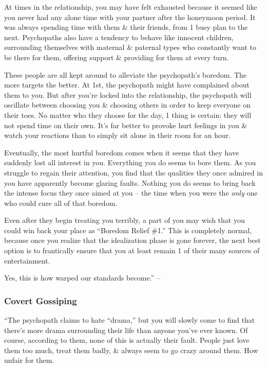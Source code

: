 \documentclass{article}
\numberwithin{equation}{section}
\begin{document}
At times in the relationship, you may have felt exhausted because it seemed like you never had any alone time with your partner after the honeymoon period. It was always spending time with them \& their friends, from 1 busy plan to the next. Psychopaths also have a tendency to behave like innocent children, surrounding themselves with maternal \& paternal types who constantly want to be there for them, offering support \& providing for them at every turn.

These people are all kept around to alleviate the psychopath's boredom. The more targets the better. At 1st, the psychopath might have complained about them to you. But after you're locked into the relationship, the psychopath will oscillate between choosing you \& choosing others in order to keep everyone on their toes. No matter who they choose for the day, 1 thing is certain: they will not spend time on their own. It's far better to provoke hurt feelings in you \& watch your reactions than to simply sit alone in their room for an hour.

Eventually, the most hurtful boredom comes when it seems that they have suddenly lost all interest in you. Everything you do seems to bore them. As you struggle to regain their attention, you find that the qualities they once admired in you have apparently become glaring faults. Nothing you do seems to bring back the intense focus they once aimed at you -- the time when you were the \textit{only} one who could cure all of that boredom.

Even after they begin treating you terribly, a part of you may wish that you could win back your place as ``Boredom Relief \#1.'' This is completely normal, because once you realize that the idealization phase is gone forever, the next best option is to frantically ensure that you at least remain 1 of their many sources of entertainment.

Yes, this is how warped our standards become.'' -- \cite[pp. 55--57]{MacKenzie2015}

\subsubsection{Covert Gossiping}
``The psychopath claims to hate ``drama,'' but you will slowly come to find that there's more drama surrounding their life than anyone you've ever known. Of course, according to them, none of this is actually their fault. People just love them too much, treat them badly, \& always seem to go crazy around them. How unfair for them.
\end{document}
